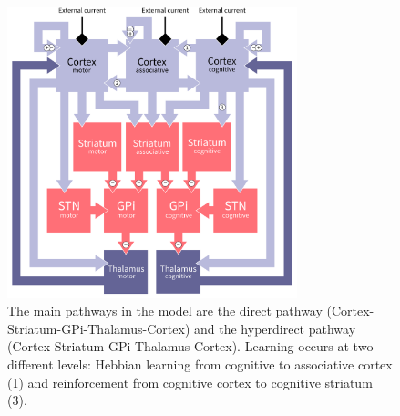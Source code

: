 
\begin{figure}[h]
  \centering \includegraphics[width=0.75\textwidth]{architecture}
  \caption{The main pathways in the model are the direct pathway
    (Cortex-Striatum-GPi-Thalamus-Cortex) and the hyperdirect pathway
    (Cortex-Striatum-GPi-Thalamus-Cortex). Learning occurs at two different
    levels: Hebbian learning from cognitive to associative cortex (1) and
    reinforcement from cognitive cortex to cognitive striatum (3).}
  \label{fig:architecture}
\end{figure}



